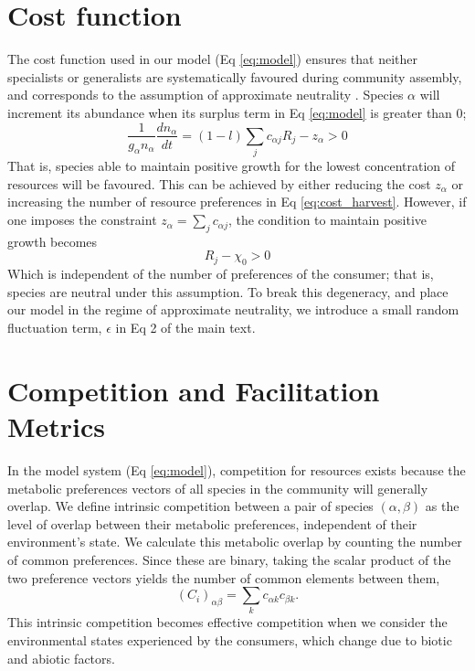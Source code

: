 \documentclass[12pt]{article}
\begin{document}
\section{Cost function}\label{cost_function}
    
The cost function used in our model (Eq \ref{eq:model}) ensures that neither specialists or generalists are systematically favoured during community assembly, and corresponds to the assumption of approximate neutrality \citep{Tikhonov2016, Tikhonov2017, Tikhonov2018}.
Species $\alpha$ will increment its abundance when its surplus term in Eq \ref{eq:model} is greater than 0;
\begin{equation}\label{eq:cost_harvest}
    \frac{1}{g_{\alpha}n_{\alpha}}\frac{dn_{\alpha}}{dt} = (1-l)\sum_j c_{\alpha j}R_j - z_{\alpha} > 0
\end{equation}
That is, species able to maintain positive growth for the lowest concentration of resources will be favoured. This can be achieved by either reducing the cost $z_{\alpha}$ or increasing the number of resource preferences in Eq \ref{eq:cost_harvest}. However, if one imposes the constraint $z_{\alpha} = \sum_j c_{\alpha j}$, the condition to maintain positive growth becomes 
\begin{equation*}
    R_j - \chi_0 > 0
\end{equation*}
Which is independent of the number of preferences of the consumer; that is, species are neutral under this assumption. To break this degeneracy, and place our model in the regime of approximate neutrality, we introduce a small random fluctuation term, $\epsilon$ in Eq 2 of the main text. 

\section{Competition and Facilitation Metrics}

In the model system (Eq \ref{eq:model}), competition for resources exists because the metabolic preferences vectors of all species in the community will generally overlap. We define intrinsic competition between a pair of species $(\alpha, \beta)$ as the level of overlap between their metabolic preferences, independent of their environment's state. We calculate this metabolic overlap by counting the number of common preferences. Since these are binary, taking the scalar product of the two preference vectors yields the number of common elements between them,
\begin{equation*}
    (C_i)_{\alpha \beta} = \sum_kc_{\alpha k}c_{\beta k}.
\end{equation*}
This intrinsic competition becomes effective competition when we consider the environmental states experienced by the consumers, which change due to biotic and abiotic factors.
\end{document}
